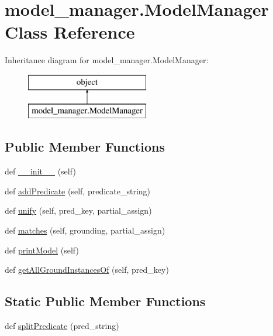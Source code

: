 \hypertarget{classmodel__manager_1_1_model_manager}{}\section{model\+\_\+manager.\+Model\+Manager Class Reference}
\label{classmodel__manager_1_1_model_manager}
Inheritance diagram for model\+\_\+manager.\+Model\+Manager\+:\begin{figure}[H]
\begin{center}
\leavevmode
\includegraphics[height=2.000000cm]{classmodel__manager_1_1_model_manager}
\end{center}
\end{figure}
\subsection*{Public Member Functions}
\begin{DoxyCompactItemize}
\item 
def \hyperlink{classmodel__manager_1_1_model_manager_ac4022bf288503dbe0c4244bd6030665a}{\+\_\+\+\_\+init\+\_\+\+\_\+} (self)
\item 
def \hyperlink{classmodel__manager_1_1_model_manager_a8ee1b63e780706cf70c09771b394ad74}{add\+Predicate} (self, predicate\+\_\+string)
\item 
def \hyperlink{classmodel__manager_1_1_model_manager_a5b455d9f9ea6fd8fe8929e5c0722cf40}{unify} (self, pred\+\_\+key, partial\+\_\+assign)
\item 
def \hyperlink{classmodel__manager_1_1_model_manager_ac655a140d67621098366316e8615b7a8}{matches} (self, grounding, partial\+\_\+assign)
\item 
def \hyperlink{classmodel__manager_1_1_model_manager_adaf953996847c9994f329949b31aacdd}{print\+Model} (self)
\item 
def \hyperlink{classmodel__manager_1_1_model_manager_ac3ed4387e5e5d451bc8f145192f43251}{get\+All\+Ground\+Instances\+Of} (self, pred\+\_\+key)
\end{DoxyCompactItemize}
\subsection*{Static Public Member Functions}
\begin{DoxyCompactItemize}
\item 
def \hyperlink{classmodel__manager_1_1_model_manager_a36cc10dbad36fe9d92633cbef7a94a20}{split\+Predicate} (pred\+\_\+string)
\end{DoxyCompactItemize}
